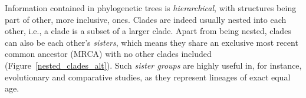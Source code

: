 Information contained in phylogenetic trees is \textit{hierarchical}, with structures being part of other, more inclusive, ones.
Clades are indeed usually nested into each other, i.e., a clade is a subset of a larger clade.
Apart from being nested, clades can also be each other's \textit{sisters}, which means they share an exclusive most recent common ancestor (MRCA) with no other clades included (Figure~\ref{nested_clades_alt}).
Such \textit{sister groups} are highly useful in, for instance, evolutionary and comparative studies, as they represent lineages of exact equal age.

% 

